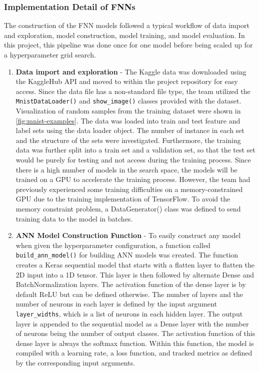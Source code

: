 \documentclass[a4paper]{article}
\begin{document}
\subsubsection{Implementation Detail of FNNs}
The construction of the FNN models followed a typical workflow of data import and exploration, model construction, model training, and model evaluation. In this project, this pipeline was done once for one model before being scaled up for a hyperparameter grid search.

\begin{enumerate}
    \item \textbf{Data import and exploration} - The Kaggle data was downloaded using the KaggleHub API and moved to within the project repository for easy access. Since the data file has a non-standard file type, the team utilized the \lstinline{MnistDataLoader()} and \lstinline{show_image()} classes provided with the dataset. Visualization of random samples from the training dataset were shown in \autoref{fig:mnist-examples}. The data was loaded into train and test feature and label sets using the data loader object. The number of instance in each set and the structure of the sets were investigated. Furthermore, the training data was further split into a train set and a validation set, so that the test set would be purely for testing and not access during the training process. Since there is a high number of models in the search space, the models will be trained on a GPU to accelerate the training process. However, the team had previously experienced some training difficulties on a memory-constrained GPU due to the training implementation of TensorFlow. To avoid the memory constraint problem, a DataGenerator() class was defined to send training data to the model in batches. 
    \item \textbf{ANN Model Construction Function} - To easily construct any model when given the hyperparameter configuration, a function called \lstinline{build_ann_model()} for building ANN models was created. The function creates a Keras sequential model that starts with a flatten layer to flatten the 2D input into a 1D tensor. This layer is then followed by alternate Dense and BatchNormalization layers. The activation function of the dense layer is by default ReLU but can be defined otherwise. The number of layers and the number of neurons in each layer is defined by the input argument \lstinline{layer_widths}, which is a list of neurons in each hidden layer. The output layer is appended to the sequential model as a Dense layer with the number of neurons being the number of output classes. The activation function of this dense layer is always the softmax function. Within this function, the model is compiled with a learning rate, a loss function, and tracked metrics as defined by the corresponding input arguments.
    

\end{enumerate}
\end{document}
